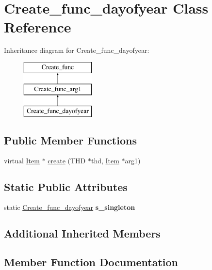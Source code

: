\hypertarget{classCreate__func__dayofyear}{}\section{Create\+\_\+func\+\_\+dayofyear Class Reference}
\label{classCreate__func__dayofyear}
Inheritance diagram for Create\+\_\+func\+\_\+dayofyear\+:\begin{figure}[H]
\begin{center}
\leavevmode
\includegraphics[height=3.000000cm]{classCreate__func__dayofyear}
\end{center}
\end{figure}
\subsection*{Public Member Functions}
\begin{DoxyCompactItemize}
\item 
virtual \mbox{\hyperlink{classItem}{Item}} $\ast$ \mbox{\hyperlink{classCreate__func__dayofyear_af62f4b2773c4c3f1c09fde260b19df4b}{create}} (T\+HD $\ast$thd, \mbox{\hyperlink{classItem}{Item}} $\ast$arg1)
\end{DoxyCompactItemize}
\subsection*{Static Public Attributes}
\begin{DoxyCompactItemize}
\item 
\mbox{\label{classCreate__func__dayofyear_a9639fee202bf4ada34a43bf2410844c9}} 
static \mbox{\hyperlink{classCreate__func__dayofyear}{Create\+\_\+func\+\_\+dayofyear}} {\bfseries s\+\_\+singleton}
\end{DoxyCompactItemize}
\subsection*{Additional Inherited Members}


\subsection{Member Function Documentation}
\mbox{\label{classCreate__func__dayofyear_af62f4b2773c4c3f1c09fde260b19df4b}} 
